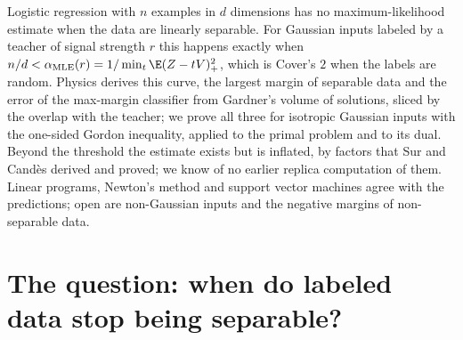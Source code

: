 \newcommand{\classificationh}{h_{\mathrm{MLE}}}
\newcommand{\classificationa}{\alpha_{\mathrm{MLE}}}
\newcommand{\classificationerr}{\mathrm{Err}}
\newcommand{\classificationprox}{\operatorname{prox}}
\newcommand{\classificationones}{\mathbf{1}}

\begin{refsection}

\begin{chaptersummary}
Logistic regression with $n$ examples in $d$ dimensions has no maximum-likelihood estimate when the data are linearly separable. For Gaussian inputs labeled by a teacher of signal strength $r$ this happens exactly when $n/d<\classificationa(r)=1/\min_t\E(Z-tV)_+^2$, which is Cover's $2$ when the labels are random. Physics derives this curve, the largest margin of separable data and the error of the max-margin classifier from Gardner's volume of solutions, sliced by the overlap with the teacher; we prove all three for isotropic Gaussian inputs with the one-sided Gordon inequality, applied to the primal problem and to its dual. Beyond the threshold the estimate exists but is inflated, by factors that Sur and Candès derived and proved; we know of no earlier replica computation of them. Linear programs, Newton's method and support vector machines agree with the predictions; open are non-Gaussian inputs and the negative margins of non-separable data.
\end{chaptersummary}

\section{The question: when do labeled data stop being separable?}\label{sec:classification:question}


\end{refsection}
